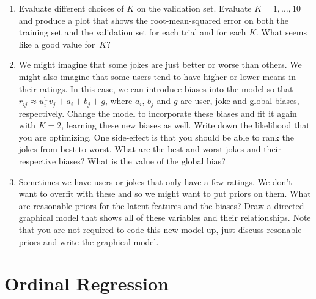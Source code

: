 \documentclass{harvardml}
\theoremstyle{plain}
\begin{document}
\begin{problem}
\begin{enumerate}[label=(\alph*)]
\item Evaluate different choices of $K$ on the validation set. Evaluate $K = 1,
\ldots, 10$ and produce a plot that shows the root-mean-squared error on both
the training set and the validation set for each trial and for each $K$. What
seems like a good value for~$K$?

 \item We might imagine that some jokes are just better or worse than others.
We might also imagine that some users tend to have higher or lower means in
their ratings. In this case, we can introduce biases into the model so that
$r_{ij} \approx u_i^\text{T} v_j + a_i + b_j + g$, where $a_i$, $b_j$ and $g$ are user,
joke and global biases, respectively.  Change the model to incorporate these
biases and fit it again with $K=2$, learning these new biases as well. Write
down the likelihood that you are optimizing. One side-effect is that you should
be able to rank the jokes from best to worst. What are the best and worst jokes
and their respective biases?  What is the value of the global bias?

 \item Sometimes we have users or jokes that only have a few ratings. We don't
want to overfit with these and so we might want to put priors on them. What are
reasonable priors for the latent features and the biases? Draw a directed
graphical model that shows all of these variables and their relationships.
Note that you are not required to code this new model up, just discuss
resonable priors and write the graphical model.


\end{enumerate}
\end{problem}

\section*{Ordinal Regression}
\end{document}
